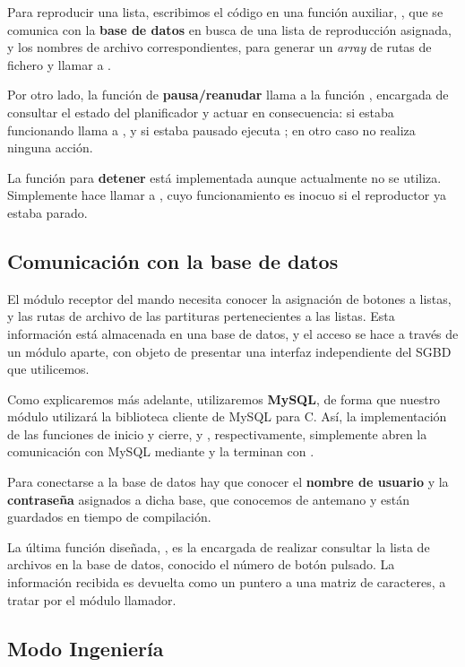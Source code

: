 Para reproducir una lista, escribimos el código en una función auxiliar, , que se comunica con la \textbf{base de datos} en busca de una lista de reproducción asignada, y los nombres de archivo correspondientes, para generar un \textit{array} de rutas de fichero y llamar a .

Por otro lado, la función de \textbf{pausa/reanudar} llama a la función , encargada de consultar el estado del planificador y actuar en consecuencia: si estaba funcionando llama a , y si estaba pausado ejecuta ; en otro caso no realiza ninguna acción.

La función para \textbf{detener} está implementada aunque actualmente no se utiliza. Simplemente hace llamar a , cuyo funcionamiento es inocuo si el reproductor ya estaba parado.

\subsection{Comunicación con la base de datos}

El módulo receptor del mando necesita conocer la asignación de botones a listas, y las rutas de archivo de las partituras pertenecientes a las listas. Esta información está almacenada en una base de datos, y el acceso se hace a través de un módulo aparte, con objeto de presentar una interfaz independiente del \acrshort{SGBD} que utilicemos.

Como explicaremos más adelante, utilizaremos \textbf{MySQL}, de forma que nuestro módulo utilizará la biblioteca cliente de MySQL para C. Así, la implementación de las funciones de inicio y cierre,  y , respectivamente, simplemente abren la comunicación con MySQL mediante  y la terminan con .

Para conectarse a la base de datos hay que conocer el \textbf{nombre de usuario} y la \textbf{contraseña} asignados a dicha base, que conocemos de antemano y están guardados en tiempo de compilación.

La última función diseñada, , es la encargada de realizar consultar la lista de archivos en la base de datos, conocido el número de botón pulsado. La información recibida es devuelta como un puntero a una matriz de caracteres, a tratar por el módulo llamador.

\subsection{Modo Ingeniería}

